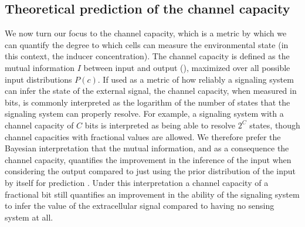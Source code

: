 \subsection{Theoretical prediction of the channel capacity}
\label{sec_channcap}

We now turn our focus to the channel capacity, which is a metric by which we
can quantify the degree to which cells can measure the environmental state (in
this context, the inducer concentration). The channel capacity is defined as
the mutual information $I$ between input and output (),
maximized over all possible input distributions $P(c)$. If used as a metric of
how reliably a signaling system can infer the state of the external signal, the
channel capacity, when measured in bits, is commonly interpreted as the
logarithm of the number of states that the signaling system can properly
resolve. For example, a signaling system with a channel capacity of $C$ bits is
interpreted as being able to resolve $2^C$ states, though channel capacities
with fractional values are allowed. We therefore prefer the Bayesian
interpretation that the mutual information, and as a consequence the channel
capacity, quantifies the improvement in the inference of the input when
considering the output compared to just using the prior distribution of the
input by itself for prediction \cite{Voliotis2014a, Bowsher2014}. Under this
interpretation a channel capacity of a fractional bit still quantifies an
improvement in the ability of the signaling system to infer the value of the
extracellular signal compared to having no sensing system at all.

